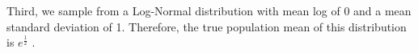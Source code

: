 \documentclass[12pt]{article}
\newenvironment{Shaded}{\begin{snugshade}}{\end{snugshade}}
\newcommand{\AttributeTok}[1]{\textcolor[rgb]{0.77,0.63,0.00}{#1}}
\newcommand{\DecValTok}[1]{\textcolor[rgb]{0.00,0.00,0.81}{#1}}
\newcommand{\FunctionTok}[1]{\textcolor[rgb]{0.00,0.00,0.00}{#1}}
\newcommand{\NormalTok}[1]{#1}
\newcommand{\OtherTok}[1]{\textcolor[rgb]{0.56,0.35,0.01}{#1}}
\newcommand{\SpecialCharTok}[1]{\textcolor[rgb]{0.00,0.00,0.00}{#1}}
\newcommand{\StringTok}[1]{\textcolor[rgb]{0.31,0.60,0.02}{#1}}
\begin{document}
\begin{Shaded}
\end{Shaded}

Third, we sample from a Log-Normal distribution with mean log of 0 and a
mean standard deviation of 1. Therefore, the true population mean of
this distribution is \(e^{\frac{1}{2}}\) \citep{Guillaume21}.
\end{document}
